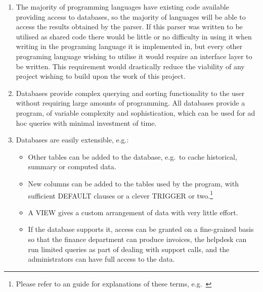 \begin{enumerate}

    \item The majority of programming languages have existing code
        available providing access to databases, so the majority of
        languages will be able to access the results obtained by the
        parser.  If this parser was written to be utilised as shared code
        there would be little or no difficulty in using it when writing in
        the programing language it is implemented in, but every other
        programing language wishing to utilise it would require an
        interface layer to be written.  This requirement would drastically
        reduce the viability of any project wishing to build upon the work
        of this project.

    \item Databases provide complex querying and sorting functionality to
        the user without requiring large amounts of programming.  All
        databases provide a program, of variable complexity and
        sophistication, which can be used for ad hoc queries with minimal
        investment of time.

    \item Databases are easily extensible, e.g.:

        \begin{itemize}

            \item Other tables can be added to the database, e.g.\ to cache
                historical, summary or computed data.

            \item New columns can be added to the tables used by the
                program, with sufficient DEFAULT clauses or a clever
                TRIGGER or two.\footnote{Please refer to an \SQL{} guide
                for explanations of these terms,
                e.g.~\cite{sql-for-web-nerds}}

            \item A VIEW gives a custom arrangement of data with very
                little effort.

            \item If the database supports it, access can be granted on a
                fine-grained basis so that the finance department can
                produce invoices, the helpdesk can run limited queries as
                part of dealing with support calls, and the administrators
                can have full access to the data.


\end{itemize}
\end{enumerate}

